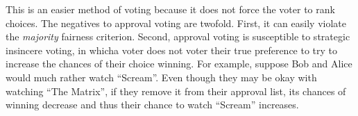 This is an easier method of voting because it does not force the voter
to rank choices. The negatives to approval voting are twofold. First,
it can easily violate the \emph{majority} fairness criterion. Second,
approval voting is susceptible to strategic insincere voting, in
whicha voter does not voter their true preference to try to increase
the chances of their choice winning. For example, suppose Bob and
Alice would much rather watch ``Scream''. Even though they may be okay
with watching ``The Matrix'', if they remove it from their approval
list, its chances of winning decrease and thus their chance to watch
``Scream'' increases.

\newpage



